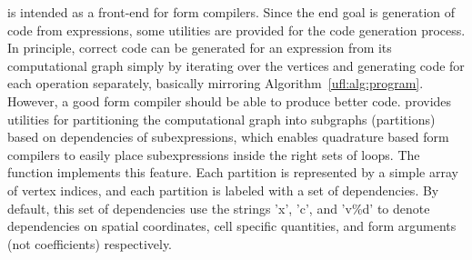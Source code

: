 \ufl{} is intended as a front-end for form compilers.  Since the end
goal is generation of code from expressions, some utilities are
provided for the code generation process. In principle, correct code
can be generated for an expression from its computational graph simply
by iterating over the vertices and generating code for each operation
separately, basically mirroring Algorithm~\ref{ufl:alg:program}.
However, a good form compiler should be able to produce better code.
\ufl{} provides utilities for partitioning the computational graph
into subgraphs (partitions) based on dependencies of subexpressions,
which enables quadrature based form compilers to easily place
subexpressions inside the right sets of loops.  The function
 implements this feature.  Each partition is
represented by a simple array of vertex indices, and each
partition is labeled with a set of dependencies. By default,
this set of dependencies use the strings 'x', 'c', and 'v\%d'
to denote dependencies on spatial coordinates, cell specific
quantities, and form arguments (not coefficients) respectively.

